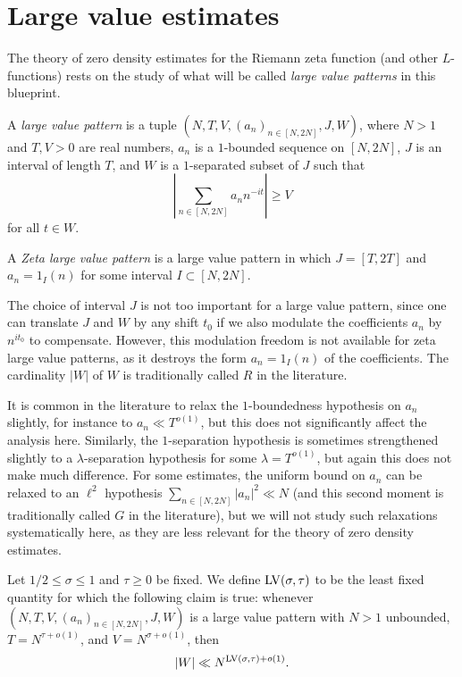 \chapter{Large value estimates}\label{largevalue-chapter}

The theory of zero density estimates for the Riemann zeta function (and other $L$-functions) rests on the study of what will be called \emph{large value patterns} in this blueprint.

\begin{definition}\label{large-pattern-def} A \emph{large value pattern} is a tuple $(N, T, V, (a_n)_{n \in [N,2N]}, J, W)$, where $N > 1$ and $T, V > 0$ are real numbers, $a_n$ is a $1$-bounded sequence on $[N,2N]$, $J$ is an interval of length $T$, and $W$ is a $1$-separated subset of $J$ such that
\begin{equation}\label{V-large}
        \left|\sum_{n \in [N,2N]} a_n n^{-it} \right| \geq V
\end{equation}
for all $t \in W$.

A \emph{Zeta large value pattern} is a large value pattern in which $J = [T,2T]$ and $a_n = 1_I(n)$ for some interval $I \subset [N,2N]$.
\end{definition}

The choice of interval $J$ is not too important for a large value pattern, since one can translate $J$ and $W$ by any shift $t_0$ if we also modulate the coefficients $a_n$ by $n^{it_0}$ to compensate.  However, this modulation freedom is not available for zeta large value patterns, as it destroys the form $a_n = 1_I(n)$ of the coefficients.  The cardinality $|W|$ of $W$ is traditionally called $R$ in the literature.

It is common in the literature to relax the $1$-boundedness hypothesis on $a_n$ slightly, for instance to $a_n \ll T^{o(1)}$, but this does not significantly affect the analysis here.  Similarly, the $1$-separation hypothesis is sometimes strengthened slightly to a $\lambda$-separation hypothesis for some $\lambda = T^{o(1)}$, but again this does not make much difference.  For some estimates, the uniform bound on $a_n$ can be relaxed to an $\ell^2$ hypothesis $\sum_{n \in [N,2N]} |a_n|^2 \ll N$ (and this second moment is traditionally called $G$ in the literature), but we will not study such relaxations systematically here, as they are less relevant for the theory of zero density estimates.

\begin{definition}\label{lv-def} Let $1/2 \leq \sigma \leq 1$ and $\tau \geq 0$ be fixed. We define $\mathrm{LV}(\sigma,\tau)$ to be the least fixed quantity for which the following claim is true: whenever $(N,T,V,(a_n)_{n \in [N,2N]},J,W)$ is a large value pattern with $N>1$ unbounded, $T = N^{\tau+o(1)}$, and $V = N^{\sigma+o(1)}$, then
$$ |W| \ll N^{\mathrm{LV}(\sigma,\tau)+o(1)}.$$
\end{definition}

